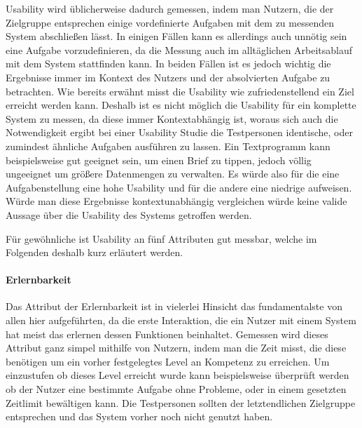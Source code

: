 Usability wird üblicherweise dadurch gemessen, indem man Nutzern, die der Zielgruppe entsprechen einige vordefinierte Aufgaben mit dem zu messenden System abschließen lässt. 
In einigen Fällen kann es allerdings auch unnötig sein eine Aufgabe vorzudefinieren, da die Messung auch im alltäglichen Arbeitsablauf mit dem System stattfinden kann.
In beiden Fällen ist es jedoch wichtig die Ergebnisse immer im Kontext des Nutzers und der absolvierten Aufgabe zu betrachten\cite{Nielsen.1995?}. 
Wie bereits erwähnt misst die Usability wie zufriedenstellend ein Ziel erreicht werden kann.
Deshalb ist es nicht möglich die Usability für ein komplette System zu messen, da diese immer Kontextabhängig ist, woraus sich auch die Notwendigkeit ergibt bei einer Usability Studie die Testpersonen identische, oder zumindest ähnliche Aufgaben ausführen zu lassen.
Ein Textprogramm kann beispielsweise gut geeignet sein, um einen Brief zu tippen, jedoch völlig ungeeignet um größere Datenmengen zu verwalten. Es würde also für die eine Aufgabenstellung eine hohe Usability und für die andere eine niedrige aufweisen. 
Würde man diese Ergebnisse kontextunabhängig vergleichen würde keine valide Aussage über die Usability des Systems getroffen werden.

Für gewöhnliche ist Usability an fünf Attributen gut messbar, welche im Folgenden deshalb kurz erläutert werden.

\paragraph{Erlernbarkeit}
Das Attribut der Erlernbarkeit ist in vielerlei Hinsicht das fundamentalste von allen hier aufgeführten, da die erste Interaktion, die ein Nutzer mit einem System hat meist das erlernen dessen Funktionen beinhaltet.
Gemessen wird dieses Attribut ganz simpel mithilfe von Nutzern, indem man die Zeit misst, die diese benötigen um ein vorher festgelegtes Level an Kompetenz zu erreichen.
Um einzustufen ob dieses Level erreicht wurde kann beispielsweise überprüft werden ob der Nutzer eine bestimmte Aufgabe ohne Probleme, oder in einem gesetzten Zeitlimit bewältigen kann.
Die Testpersonen sollten der letztendlichen Zielgruppe entsprechen und das System vorher noch nicht genutzt haben\cite{Nielsen.1995?}.

